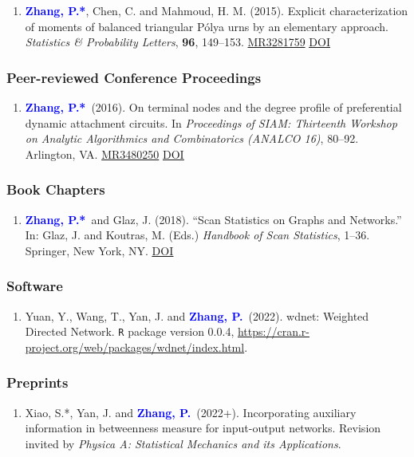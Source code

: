 \documentclass{res}
\def\MR#1{\href{http://www.ams.org/mathscinet-getitem?mr=#1}{MR#1}}
\newcommand{\PZ}{\textbf{\textcolor{blue}{Zhang, P.*}}}
\newcommand{\PZnot}{\textbf{\textcolor{blue}{Zhang, P.}}}
\begin{document}
\begin{resume}
\begin{enumerate}
	\item \PZ, {\sc Chen, C.} and {\sc Mahmoud, H. M.} 
	(2015). Explicit characterization of moments of balanced 
	triangular P\'{o}lya urns by an elementary approach. 
	\emph{Statistics \& Probability Letters}, {\bf 96}, 149--153. 
	\MR{3281759}
	\href{https://doi.org/10.1016/j.spl.2014.09.016}
	{\underline{DOI}}	
\end{enumerate} 

\subsubsection{Peer-reviewed Conference Proceedings}
\begin{enumerate}
	\item \PZ\ (2016). On terminal nodes and the degree 
	profile of preferential dynamic attachment circuits. In 
	\emph{Proceedings of SIAM: Thirteenth Workshop on Analytic 
	Algorithmics and Combinatorics (ANALCO 16)}, 80--92. Arlington, 
	VA. \MR{3480250}
	\href{https://doi.org/10.1137/1.9781611974324.9}
	{\underline{DOI}}	
\end{enumerate}

\subsubsection{Book Chapters}
\begin{enumerate}
	\item \PZ\ and {\sc Glaz, J.} (2018). ``Scan 
	Statistics on Graphs and Networks.'' In: Glaz, J. and Koutras, 
	M. (Eds.) {\em Handbook of Scan Statistics}, 1--36. Springer, 
	New York, NY. 
	\href{https://doi.org/10.1007/978-1-4614-8414-1_43-1}
	{\underline{DOI}}	
\end{enumerate}

\subsubsection{Software}
\begin{enumerate}
	\item {\sc Yuan, Y., Wang, T., Yan, J.} and \PZnot\ (2022). 
	wdnet: Weighted Directed Network. {\tt R} package version 0.0.4, 
	\url{https://cran.r-project.org/web/packages/wdnet/index.html}.
\end{enumerate}

\subsubsection{Preprints}
\begin{enumerate}
	\item {\sc Xiao, S.*, Yan, J.} and \PZnot\ (2022+). 
	Incorporating auxiliary information in betweenness measure for
	input-output networks. Revision invited by {\em Physica A: 
	Statistical Mechanics and its Applications}.
	

\end{enumerate}
\end{resume}
\end{document}
